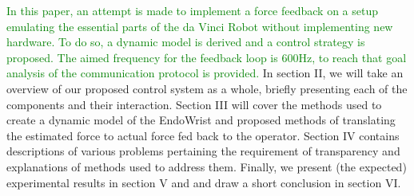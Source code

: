\textcolor{green}{In this paper, an attempt is made to implement a force feedback on a setup emulating the essential parts of the da Vinci Robot without implementing new hardware. To do so, a dynamic model is derived and a control strategy is proposed. The aimed frequency for the feedback loop is 600Hz, to reach that goal analysis of the communication protocol is provided.}
In section II, we will take an overview of our proposed control system as a whole, briefly presenting each of the components and their interaction.
Section III will cover the methods used to create a dynamic model of the EndoWrist and proposed methods of translating the estimated force to actual force fed back to the operator.
Section IV contains descriptions of various problems pertaining the requirement of transparency and explanations of methods used to address them.
Finally,  we present (the expected) experimental results in section V and and draw a short conclusion in section VI.







